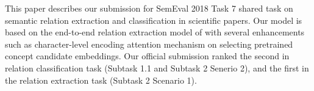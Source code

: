 This paper describes our submission for SemEval 2018 Task 7 shared task on semantic relation extraction and classification in scientific papers. Our model is based on the end-to-end relation extraction model of \cite{miwa2016end}  with several enhancements such as character-level encoding attention mechanism on selecting pretrained concept candidate embeddings. Our official submission ranked the second in relation classification task (Subtask 1.1 and Subtask 2 Senerio 2), and the first in the relation extraction task (Subtask 2 Scenario 1).
